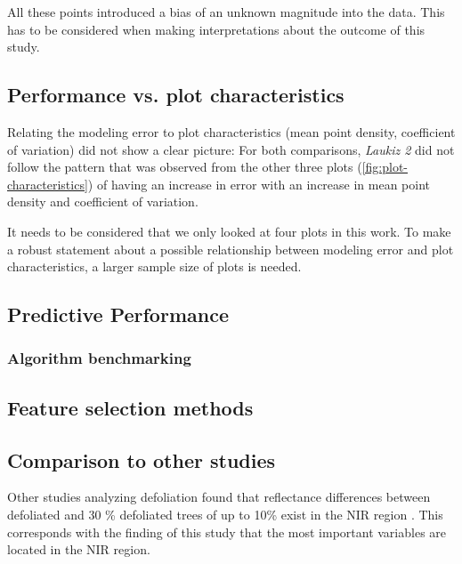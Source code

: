 \documentclass[review]{elsarticle}
\begin{document}
All these points introduced a bias of an unknown magnitude into the data.
This has to be considered when making interpretations about the outcome of this study.

\subsection{Performance vs. plot characteristics}

\noindent Relating the modeling error to plot characteristics (mean point density, coefficient of variation) did not show a clear picture: For both comparisons, \textit{Laukiz 2} did not follow the pattern that was observed from the other three plots (\autoref{fig:plot-characteristics}) of having an increase in error with an increase in mean point density and coefficient of variation.

It needs to be considered that we only looked at four plots in this work.
To make a robust statement about a possible relationship between modeling error and plot characteristics, a larger sample size of plots is needed.

\subsection{Predictive Performance}

\subsubsection{Algorithm benchmarking}

\subsection{Feature selection methods}

\subsection{Comparison to other studies}

\noindent Other studies analyzing defoliation found that reflectance differences between defoliated and 30 \% defoliated trees of up to 10\% exist in the \ac{NIR} region \citep{rengara2016}.
This corresponds with the finding of this study that the most important variables are located in the NIR region.
\end{document}
